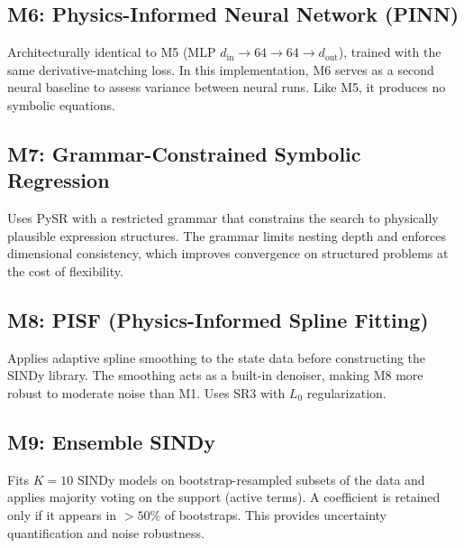 \subsection{M6: Physics-Informed Neural Network (PINN)}
Architecturally identical to M5 (MLP $d_\text{in} \to 64 \to 64 \to d_\text{out}$), trained with the same derivative-matching loss. In this implementation, M6 serves as a second neural baseline to assess variance between neural runs. Like M5, it produces no symbolic equations.

\subsection{M7: Grammar-Constrained Symbolic Regression}
Uses PySR with a restricted grammar that constrains the search to physically plausible expression structures. The grammar limits nesting depth and enforces dimensional consistency, which improves convergence on structured problems at the cost of flexibility.

\subsection{M8: PISF (Physics-Informed Spline Fitting)}
Applies adaptive spline smoothing to the state data before constructing the SINDy library. The smoothing acts as a built-in denoiser, making M8 more robust to moderate noise than M1. Uses SR3 with $L_0$ regularization.

\subsection{M9: Ensemble SINDy}
Fits $K = 10$ SINDy models on bootstrap-resampled subsets of the data and applies majority voting on the support (active terms). A coefficient is retained only if it appears in $>50\%$ of bootstraps. This provides uncertainty quantification and noise robustness.
